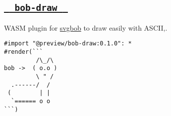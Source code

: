 \pandocbounded{}

\subsection{\texorpdfstring{\hyperref[bob-draw]{\texttt{\ }{\texttt{\ bob-draw\ }}\texttt{\ }}}{  bob-draw  }}\label{bob-draw}

WASM plugin for \href{https://github.com/ivanceras/svgbob}{svgbob} to
draw easily with ASCII,.

\begin{verbatim}
#import "@preview/bob-draw:0.1.0": *
#render(```
         /\_/\
bob ->  ( o.o )
         \ " /
  .------/  /
 (        | |
  `====== o o
```)
\end{verbatim}

\pandocbounded{}

